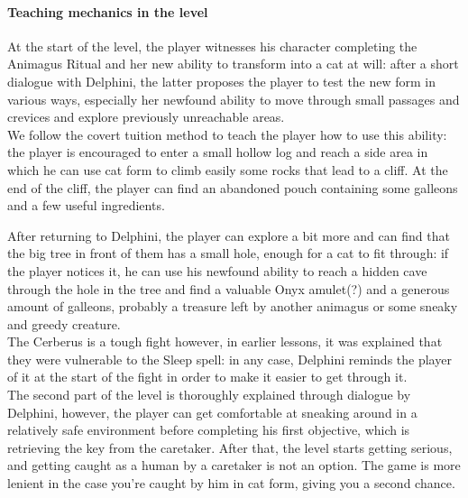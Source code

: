 \paragraph{Teaching mechanics in the level}
At the start of the level, the player witnesses his character completing the Animagus Ritual and her new ability to transform into a cat at will: after a short dialogue with Delphini, the latter proposes the player to test the new form in various
ways, especially her newfound ability to move through small passages and crevices and explore previously unreachable areas. \\

We follow the covert tuition method to teach the player how to use this ability: the player is encouraged to enter a small hollow log and reach a side area in which he can use cat form to climb easily some rocks that lead to a cliff. At the end of the cliff, the player can find an abandoned pouch containing some galleons and a few useful ingredients.

After returning to Delphini, the player can explore a bit more and can find that the big tree in front of them has a small hole, enough for a cat to fit through: if the player notices it, he can use his newfound ability to reach a hidden cave through the hole in the tree and find a valuable Onyx amulet(?) and a generous amount of galleons, probably a treasure left by another animagus or some sneaky and greedy creature.\\

The Cerberus is a tough fight however, in earlier lessons, it was explained that they were vulnerable to the Sleep spell: in any case, Delphini reminds the player of it at the start of the fight in order to make it easier to get through it. \\

The second part of the level is thoroughly explained through dialogue by Delphini, however, the player can get comfortable at sneaking around in a relatively safe environment before completing his first objective, which is retrieving the key from the caretaker. After that, the level starts getting serious, and getting caught as a human by a caretaker is not an option. The game is more lenient in the case you're caught by him in cat form, giving you a second chance.

\pagebreak